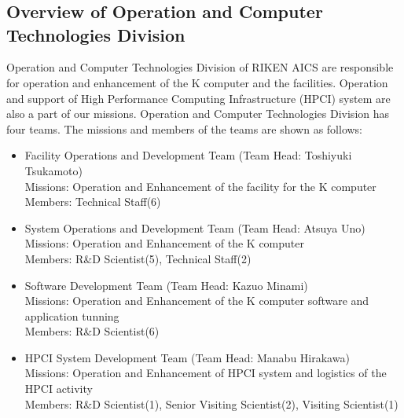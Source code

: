 \chapter*{}

\section*{Overview of Operation and Computer Technologies Division}
Operation and Computer Technologies Division of RIKEN AICS are responsible for operation and enhancement of the K computer
and the facilities. Operation and support of High Performance Computing Infrastructure (HPCI) system are
also a part of our missions.
Operation and Computer Technologies Division has four teams.
The missions and members of the teams are shown as follows:
\begin{itemize}
\item Facility Operations and Development Team (Team Head: Toshiyuki Tsukamoto)\\
  Missions: Operation and Enhancement of the facility for the K computer\\
  Members: Technical Staff(6)
\item System Operations and Development Team (Team Head: Atsuya Uno)\\
  Missions: Operation and Enhancement of the K computer\\
  Members: R\&D Scientist(5), Technical Staff(2)
\item Software Development Team (Team Head: Kazuo Minami)\\
  Missions: Operation and Enhancement of the K computer software and application tunning\\
  Members: R\&D Scientist(6)
\item HPCI System Development Team (Team Head: Manabu Hirakawa)\\
  Missions: Operation and Enhancement of HPCI system and logistics of the HPCI activity\\
  Members: R\&D Scientist(1), Senior Visiting Scientist(2), Visiting Scientist(1)
\end{itemize}


